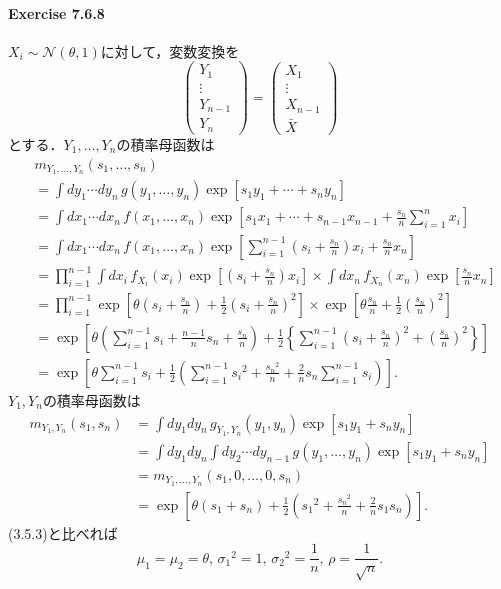 \paragraph{Exercise 7.6.8}
\(X_i \sim \mathcal{N}(\theta, 1)\)に対して，変数変換を
\[
\begin{pmatrix}
  Y_1 \\ \vdots \\ Y_{n-1} \\ Y_n
\end{pmatrix}
=
\begin{pmatrix}
  X_1 \\ \vdots \\ X_{n-1} \\ \bar{X}
\end{pmatrix}
\]
とする．\(Y_1, \ldots, Y_n\)の積率母函数は
\begin{align*}
  & m_{Y_1,\ldots,Y_n}(s_1, \ldots, s_n) \\
  &= \int dy_1 \cdots dy_n \, g(y_1,\ldots,y_n) \exp \left[ s_1 y_1 + \cdots + s_n y_n \right] \\
  &= \int dx_1 \cdots dx_n \, f(x_1,\ldots,x_n)
  \exp \left[ s_1 x_1 + \cdots + s_{n-1} x_{n-1} + \frac{s_n}{n} \sum_{i=1}^n x_i \right] \\
  &= \int dx_1 \cdots dx_n \, f(x_1,\ldots,x_n)
  \exp \left[ \sum_{i=1}^{n-1} \left( s_i + \frac{s_n}{n} \right) x_i + \frac{s_n}{n} x_n \right] \\
  &= \prod_{i=1}^{n-1} \int dx_i \, f_{X_i}(x_i) \exp \left[ \left( s_i + \frac{s_n}{n} \right) x_i \right]
  \times \int dx_n \, f_{X_n}(x_n) \exp \left[ \frac{s_n}{n} x_n \right] \\
  &= \prod_{i=1}^{n-1} \exp \left[ \theta \left( s_i + \frac{s_n}{n} \right) + \frac{1}{2} \left( s_i + \frac{s_n}{n} \right)^2 \right]
  \times \exp \left[ \theta \frac{s_n}{n} + \frac{1}{2} \left( \frac{s_n}{n} \right)^2 \right] \\
  &= \exp \left[ \theta \left( \sum_{i=1}^{n-1} s_i + \frac{n-1}{n} s_n + \frac{s_n}{n} \right)
  + \frac{1}{2} \left\{ \sum_{i=1}^{n-1} \left( s_i + \frac{s_n}{n} \right)^2 + \left( \frac{s_n}{n} \right)^2 \right\} \right] \\
  &= \exp \left[ \theta \sum_{i=1}^{n-1} s_i + \frac{1}{2} \left( \sum_{i=1}^{n-1} s_i{}^2 + \frac{s_n{}^2}{n} + \frac{2}{n} s_n \sum_{i=1}^{n-1} s_i \right) \right] .
\end{align*}
\(Y_1, Y_n\)の積率母函数は
\begin{align*}
  m_{Y_1,Y_n}(s_1, s_n) &= \int dy_1 dy_n \, g_{Y_1,Y_n}(y_1, y_n) \exp \left[ s_1 y_1 + s_n y_n \right] \\
  &= \int dy_1 dy_n \int dy_2 \cdots dy_{n-1} \, g(y_1, \ldots, y_n) \exp \left[ s_1 y_1 + s_n y_n \right] \\
  &= m_{Y_1,\ldots,Y_n}(s_1, 0, \ldots, 0, s_n) \\
  &= \exp \left[ \theta (s_1+s_n) + \frac{1}{2} \left( s_1{}^2 + \frac{s_n{}^2}{n} + \frac{2}{n} s_ 1s_n \right) \right] .
\end{align*}
(3.5.3)と比べれば
\[
\mu_1 = \mu_2 = \theta, \, \sigma_1{}^2 = 1, \, \sigma_2{}^2 = \frac{1}{n} , \, \rho = \frac{1}{\sqrt{n}} .
\]
